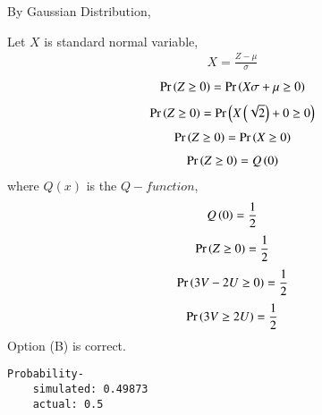 \documentclass[journal,12pt,twocolumn]{IEEEtran}
\begin{document}
By Gaussian Distribution,

Let $X$ is standard normal variable,
\begin{align}
    X=\frac{Z-\mu}{\sigma}
\end{align}
\begin{align}
    \Pr\left(Z\geq0\right)=\Pr\left(X\sigma+\mu\geq0\right)
\end{align}
\begin{align}
    \Pr\left(Z\geq0\right)=\Pr\left(X\left(\sqrt{2}\right)+0\geq0\right)
\end{align}
\begin{align}
    \Pr\left(Z\geq0\right)=\Pr\left(X\geq0\right)
\end{align}
\begin{align}
    \Pr\left(Z\geq0\right)=Q\left(0\right)
\end{align}
where $Q(x)$ is the $Q-function$,
\begin{align}
    Q\left(0\right)=\frac{1}{2}
\end{align}
\begin{align}
    \Pr\left(Z\geq0\right)=\frac{1}{2}
\end{align}
\begin{align}
    \Pr\left(3V-2U\geq0\right)=\frac{1}{2}
\end{align}
\begin{align}
    \Pr\left(3V\geq2U\right)=\frac{1}{2}
\end{align}
Option (B) is correct.
\begin{lstlisting}
Probability-
    simulated: 0.49873
    actual: 0.5
\end{lstlisting}
\end{document}
